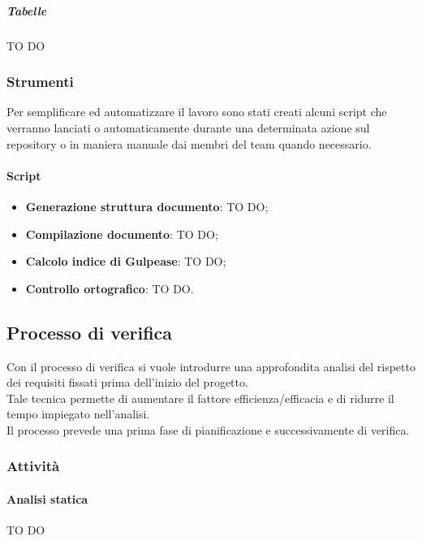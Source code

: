 				\subparagraph{Tabelle} TO DO
		
		\subsubsection{Strumenti} %
		\label{ssub:strumenti}
		Per semplificare ed automatizzare il lavoro sono stati creati alcuni script che verranno lanciati o automaticamente durante una determinata azione sul repository o in maniera manuale dai membri del team quando necessario.
			\paragraph{Script} %
			\label{par:script_doc}
				\begin{itemize}
					\item \textbf{Generazione struttura documento}: TO DO;
					\item \textbf{Compilazione documento}: TO DO;
					\item \textbf{Calcolo indice di Gulpease}: TO DO;
					\item \textbf{Controllo ortografico}: TO DO.
				\end{itemize}
			








	\subsection{Processo di verifica}
	Con il processo di verifica si vuole introdurre una approfondita analisi del rispetto dei requisiti fissati prima dell'inizio del progetto.\\
	Tale tecnica permette di aumentare il fattore efficienza/efficacia e di ridurre il tempo impiegato nell'analisi.\\
	Il processo prevede una prima fase di pianificazione e successivamente di verifica.

		\subsubsection{Attività}
			\paragraph{Analisi statica} %
			\label{par:analisi_statica}
			TO DO
			
